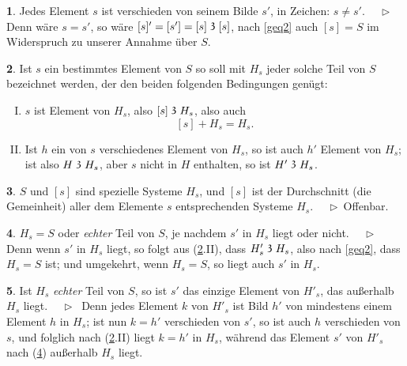 \documentclass[leqno,hidelinks,a4paper]{article}
\theoremstyle{definition}
\newtheorem{satz}{\protect\satzname}
\newtheorem{deff}[satz]{\protect\deffname}
\newcommand{\satzname}{}
\newcommand{\deffname}{}
\renewcommand{\satzname}{\hspace{-4pt}.\ Satz}%
\renewcommand{\deffname}{\hspace{-4pt}.\ Definition}%
\renewcommand{\satzname}{\hspace{-4pt}.\ Theorem}%
\renewcommand{\deffname}{\hspace{-4pt}.\ Definition}%
\newcommand\Beweis{\medskip \newline $ \phantom{'.'} \rhd \ $}%
\newcommand\TeilVon{\mathrel{\raisebox{0.45ex}{$\mathfrak{3}$}}}
\begin{document}
\begin{paracol}{2}
\smallskip

\begin{satz}\label{gthm2}
Jedes Element $s$ ist verschieden von seinem Bilde $s'$, in Zeichen: $s \neq s'$.
\Beweis
Denn wäre $s = s'$, so wäre $[s]' = [s'] = [s] \TeilVon [s]$, nach \eqref{geq2}
auch $[s] = S$ im Widerspruch zu unserer Annahme über $S$.
\end{satz}

\newpage

\begin{deff}\label{gdef3}
Ist $s$ ein bestimmtes Element von $S$ so soll mit $H_s$ jeder solche Teil von
$S$ bezeichnet werden, der den beiden folgenden Bedingungen genügt:
\begin{enumerate}[I.]
\item $s$ ist Element von $H_s$, also $[s] \TeilVon H_s$, also auch
\[
	[s] + H_s = H_s.
\]
\item Ist $h$ ein von $s$ verschiedenes Element von $H_s$, so ist auch $h'$
Element von $H_s$; ist also $H \TeilVon H_s$, aber $s$ nicht in $H$ enthalten,
so ist $H' \TeilVon H_s$.
\end{enumerate}
\end{deff}

\begin{satz}\label{gthm4}
$S$ und $[s]$ sind spezielle Systeme $H_s$, und $[s]$ ist der Durchschnitt
(die Gemeinheit) aller dem Elemente $s$ entsprechenden Systeme $H_s$.
\Beweis Offenbar.
\end{satz}

\begin{satz}\label{gthm5}
$H_s = S$ oder \textit{echter} Teil von $S$, je nachdem $s'$ in $H_s$ liegt oder nicht.
\Beweis
Denn wenn $s'$ in $H_s$ liegt, so folgt aus (\ref{gdef3}.II), dass $H'_s \TeilVon H_s$,
also nach \eqref{geq2}, dass $H_s = S$ ist; und umgekehrt, wenn $H_s = S$, so liegt
auch $s'$ in $H_s$.
\end{satz}

\begin{satz}\label{gthm6}
Ist $H_s$ \emph{echter} Teil von $S$, so ist $s'$ das einzige Element von $H'_s$,
das außerhalb $H_s$ liegt.
\Beweis
Denn jedes Element $k$ von $H'_s$ ist Bild $h'$ von mindestens einem Element $h$
in $H_s$; ist nun $k=h'$ verschieden von $s'$, so ist auch $h$ verschieden von $s$,
und folglich nach (\ref{gdef3}.II) liegt $k = h'$ in $H_s$, während das Element $s'$
von $H'_s$ nach (\ref{gthm5}) außerhalb $H_s$ liegt.
\end{satz}


\end{paracol}
\end{document}
